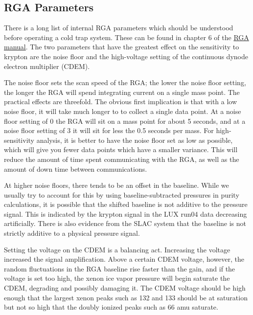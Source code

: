 \documentclass[12pt]{article}
\begin{document}
\subsection{RGA Parameters} 
There is a long list of internal RGA parameters which should be understood before operating a cold trap system. These can be found in chapter 6 of the \href{http://www.thinksrs.com/downloads/PDFs/Manuals/RGAm.pdf}{RGA manual}. The two parameters that have the greatest effect on the sensitivity to krypton are the noise floor and the high-voltage setting of the continuous dynode electron multiplier (CDEM). 

The noise floor sets the scan speed of the RGA; the lower the noise floor setting, the longer the RGA will spend integrating current on a single mass point. The practical effects are threefold. The obvious first implication is that with a low noise floor, it will take much longer to to collect a single data point. At a noise floor setting of 0 the RGA will sit on a mass point for about 5 seconds, and at a noise floor setting of 3 it will sit for less the 0.5 seconds per mass. For high-sensitivity analysis, it is better to have the noise floor set as low as possible, which will give you fewer data points which have a smaller variance. This will reduce the amount of time spent communicating with the RGA, as well as the amount of down time between communications. 

{\color{red}At higher noise floors, there tends to be an offset in the baseline. While we usually try to account for this by using baseline-subtracted pressures in purity calculations, it is possible that the shifted baseline is not additive to the pressure signal. This is indicated by the krypton signal in the LUX run04 data decreasing artificially. There is also evidence from the SLAC system that the baseline is not strictly additive to a physical pressure signal.}

Setting the voltage on the CDEM is a balancing act. Increasing the voltage increased the signal amplification. Above a certain CDEM voltage, however, the random fluctuations in the RGA baseline rise faster than the gain, and if the voltage is set too high, the xenon ice vapor pressure will begin saturate the CDEM, degrading and possibly damaging it. The CDEM voltage should be high enough that the largest xenon peaks such as 132 and 133 should be at saturation but not so high that the doubly ionized peaks such as 66 amu saturate. 
\end{document}
